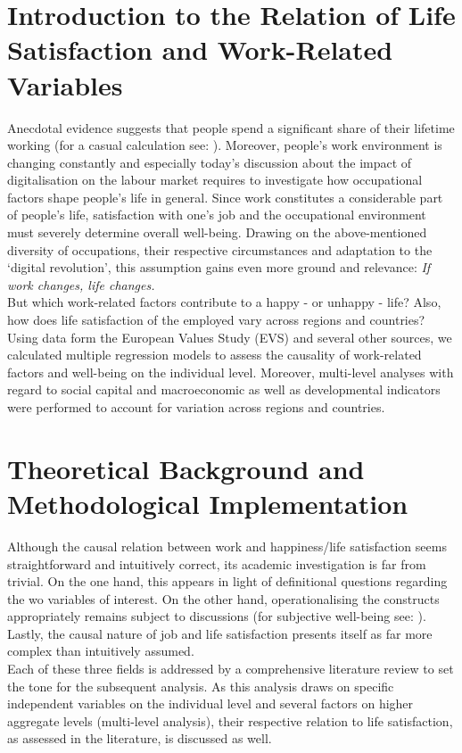 \documentclass[preprint,12pt,authoryear]{elsarticle}
\begin{document}
	\section{Introduction to the Relation of Life Satisfaction and Work-Related Variables}
	Anecdotal evidence suggests that people spend a significant share of their lifetime working (for a casual calculation 
	see: \citet{thompson_what_2016}). Moreover, people's work environment is changing constantly and especially today's 
	discussion about the impact of digitalisation on the labour market requires to investigate how occupational factors shape 
	people's life in general. Since work constitutes a considerable part of people’s life, satisfaction with one’s job and the
	occupational environment must severely determine overall well-being. Drawing on the above-mentioned diversity of 
	occupations, their respective circumstances and adaptation to the ‘digital revolution’, this assumption gains even more 
	ground and relevance: \textit{If work changes, life changes.} \\
	But which work-related factors contribute to a happy - or unhappy - life? Also, how does life satisfaction of the employed
	vary across regions and countries? \\
	Using data form the European Values Study (EVS) and several other sources, we calculated multiple regression models to assess the causality of
	work-related factors and well-being on the individual level. Moreover, multi-level analyses with regard to social capital and
	macroeconomic as well as developmental indicators were performed to account for variation across regions and countries. 
		
	\section{Theoretical Background and Methodological Implementation}
	Although the causal relation between work and happiness/life satisfaction seems straightforward and intuitively correct,
	its academic investigation is far from trivial. On the one hand, this appears in light of definitional questions regarding the 
	wo variables of interest. On the other hand, operationalising the constructs appropriately remains subject to discussions
	(for subjective well-being see: \citet{kahneman_developments_2006,layard_measuring_2010}). Lastly, the causal nature of job and life
	satisfaction presents itself as far more complex than intuitively assumed. \\
	Each of these three fields is addressed by a comprehensive literature review to set the tone for the subsequent analysis.
	As this analysis draws on specific independent variables on the individual level and several factors on higher aggregate
	levels (multi-level analysis), their respective relation to life satisfaction, as assessed in the literature, is discussed as well.
	
\end{document}
